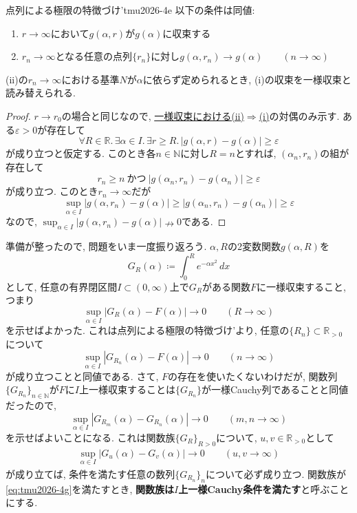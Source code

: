 \documentclass[titlepage]{jsarticle}
\numberwithin{equation}{section}
\newcommand{\N}{\mathbb{N}}%
\newcommand{\R}{\mathbb{R}}%
\begin{document}
\begin{thm}{点列による極限の特徴づけ'}{tmu2026-4e}
以下の条件は同値:
\begin{enumerate}
\item[(i)]$r \to \infty$において$g(\alpha, r)$が$g(\alpha)$に収束する
\item[(ii)]$r_n \to \infty$となる任意の点列$\{r_n\}$に対し$g(\alpha, r_n) \to g(\alpha)\qquad(n \to \infty)$
\end{enumerate}
(ii)の$r_n \to \infty$における基準$N$が$\alpha$に依らず定められるとき, (i)の収束を一様収束と読み替えられる.
\end{thm}
\begin{proof}
$r \to r_0$の場合と同じなので, \uline{一様収束における(ii)$\Rightarrow$(i)}の対偶のみ示す. ある$\varepsilon >0$が存在して
\[
\forall R\in\R.\, \exists\alpha \in I.\, \exists r \ge R.\, |g(\alpha, r) - g(\alpha)| \ge \varepsilon
\]
が成り立つと仮定する. このとき各$n \in \N$に対し$R = n$とすれば, $(\alpha_n, r_n)$の組が存在して
\[
r_n \ge n\:\text{かつ}\:|g(\alpha_n, r_n)- g(\alpha_n)| \ge \varepsilon
\]
が成り立つ. このとき$r_n \to \infty$だが
\[
\sup_{\alpha \in I} |g(\alpha, r_n) - g(\alpha)| \ge |g(\alpha_n, r_n) - g(\alpha_n)| \ge \varepsilon
\]
なので, $\sup_{\alpha \in I} |g(\alpha, r_n)- g(\alpha)| \nrightarrow 0$である.
\end{proof}
準備が整ったので, 問題をいま一度振り返ろう. $\alpha, R$の2変数関数$g(\alpha, R)$を
\[
G_R(\alpha) \coloneq \int_0^R e^{-\alpha x^2}\, dx
\]
として, 任意の有界閉区間$I \subset (0, \infty)$上で$G_R$がある関数$F$に一様収束すること, つまり
\[
\sup_{\alpha \in I} |G_R(\alpha) - F(\alpha)| \to 0 \qquad (R \to \infty)
\]
を示せばよかった. これは点列による極限の特徴づけ'より, 任意の$\{R_n\} \subset \R_{>0}$について
\[
\sup_{\alpha \in I} |G_{R_n}(\alpha) - F(\alpha)| \to 0\qquad (n\to \infty)
\]
が成り立つことと同値である. さて, $F$の存在を使いたくないわけだが, 関数列$\{G_{R_n}\}_{n \in \N}$が$F$に$I$上一様収束することは$\{G_{R_n}\}$が一様Cauchy列であることと同値だったので,
\[
\sup_{\alpha \in I} |G_{R_m}(\alpha) - G_{R_n}(\alpha)| \to 0\qquad (m, n \to \infty)
\]
を示せばよいことになる. これは関数族$\{G_R\}_{R>0}$について, $u, v \in \R_{>0}$として
\begin{align}
\sup_{\alpha \in I} |G_u(\alpha) - G_v(\alpha)| \to 0\qquad (u, v \to \infty) \label{eq:tmu2026-4g}
\end{align}
が成り立てば, 条件を満たす任意の数列$\{G_{R_n}\}_n$について必ず成り立つ. 関数族が\eqref{eq:tmu2026-4g}を満たすとき, \textbf{関数族は$I$上一様Cauchy条件を満たす}と呼ぶことにする. 
\end{document}

